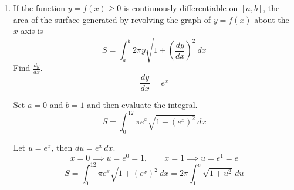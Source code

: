 \documentclass[a4paper, 12pt]{article}
\begin{document}
\begin{enumerate}[leftmargin=*,label=\textbf{\arabic*.}]
\begin{enumerate}[leftmargin=*,label=\textbf{\alph*.}]
Equate the coefficients of like terms.
\[\left.\begin{array}{c}
A+B=0\\
A\left(\frac{3+\sqrt5}2\right)+B\left(\frac{3-\sqrt5}2\right)=1
\end{array}\right\}\implies A=\frac1{\sqrt5},\quad B=-\frac1{\sqrt5}\]

Substitute the values into $A$ and $B$.
\begin{align*}I&=\int\left(\frac A{x+\frac32-\frac{\sqrt5}2}+\frac B{x+\frac32+\frac{\sqrt5}2}\right)\,dx\\[1em]&=\int\left(\frac1{\sqrt5\left(x+\frac32-\frac{\sqrt5}2\right)}-\frac1{\sqrt5\left(x+\frac32+\frac{\sqrt5}2\right)}\right)\,dx\\[1em]&=\boxed{\frac1{\sqrt5}\left(\ln\left|x+\frac32-\frac{\sqrt5}2\right|-\ln\left|x+\frac32+\frac{\sqrt5}2\right|\right)+C,\quad C\in\mathbb{R}}\end{align*}

\item The integral:
\begin{align*}I=\int\frac{\sin x}{1+\sin x}\,dx=\int\frac{1+\sin x-1}{1+\sin x}\,dx=\int dx-\int\frac{dx}{1+\sin x}\end{align*}

The integral on the left evaluates to $x+C_1$. Evaluate the other integral.
\begin{align*}\int\frac{dx}{1+\sin x}&=\int\frac{1-\sin x}{(1+\sin x)(1-\sin x)}\,dx=\int\frac{1-\sin x}{1-\sin^2x}\,dx=\int\frac{1-\sin x}{\cos^2x}\,dx\\[1em]&=\int\left(\sec^2x-\tan x\sec x\right)\,dx=\tan x-\sec x+C_2\end{align*}

So, the result is
\[\boxed{I=x-\tan x+\sec x+C,\quad C\in\mathbb{R}}\]
\end{enumerate}

\item If the function $y=f(x)\geq0$ is continuously differentiable on $[a,b]$, the area of the surface generated by revolving the graph of $y=f(x)$ about the $x$-axis is
\[S=\int_a^b2\pi y\sqrt{1+\left(\frac{dy}{dx}\right)^2}\,dx\]
Find $\displaystyle\frac{dy}{dx}$.
\[\frac{dy}{dx}= e^x\]

Set $a=0$ and $b=1$ and then evaluate the integral.
\[S=\int_0^12\pi e^x\sqrt{1+\left( e^x\right)^2}\,dx\]

Let $u= e^x$, then $du= e^x\,dx$.
\[x=0\implies u= e^0=1,\qquad x=1\implies u= e^1= e\]
\[S=\int_0^12\pi e^x\sqrt{1+\left( e^x\right)^2}\,dx=2\pi\int_1^{ e}\sqrt{1+u^2}\,du\]


\end{enumerate}
\end{document}
